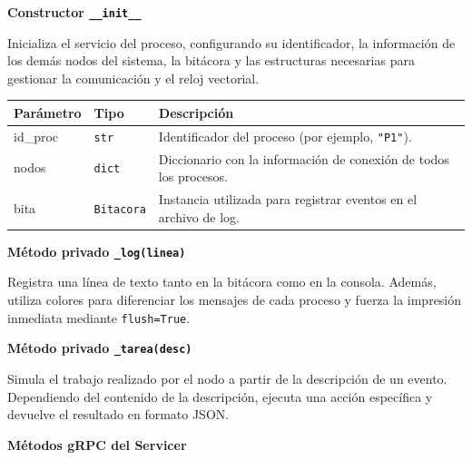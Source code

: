 \documentclass[letterpaper,11pt]{article}
\begin{document}
\textbf{Constructor \texttt{\_\_init\_\_}}

Inicializa el servicio del proceso, configurando su identificador, la
información de los demás nodos del sistema, la bitácora y las estructuras
necesarias para gestionar la comunicación y el reloj vectorial.

\begin{center}
\begin{tabular}{>{\ttfamily}l l p{6.5cm}}
\toprule
\textbf{Parámetro} & \textbf{Tipo} & \textbf{Descripción} \\
\midrule
id\_proc & \texttt{str}      & Identificador del proceso (por ejemplo, \texttt{"P1"}). \\
nodos    & \texttt{dict}     & Diccionario con la información de conexión de todos los procesos. \\
bita     & \texttt{Bitacora} & Instancia utilizada para registrar eventos en el archivo de log. \\
\bottomrule
\end{tabular}
\end{center}

\textbf{Método privado \texttt{\_log(linea)}}

Registra una línea de texto tanto en la bitácora como en la consola.
Además, utiliza colores para diferenciar los mensajes de cada proceso y
fuerza la impresión inmediata mediante \texttt{flush=True}.

\textbf{Método privado \texttt{\_tarea(desc)}}

Simula el trabajo realizado por el nodo a partir de la descripción de un
evento. Dependiendo del contenido de la descripción, ejecuta una acción
específica y devuelve el resultado en formato JSON.


\textbf{Métodos gRPC del Servicer}
\end{document}
